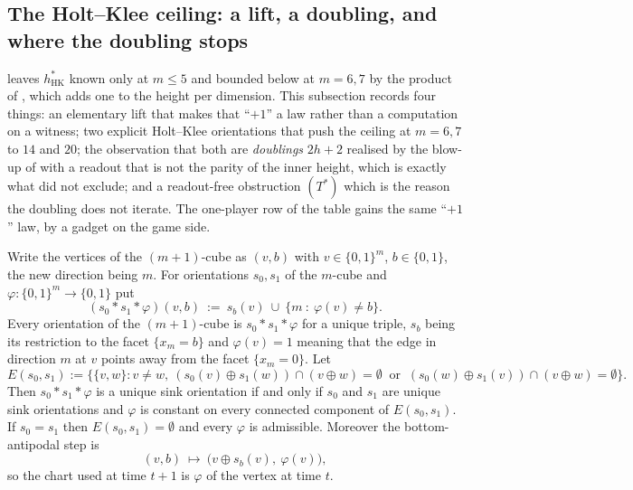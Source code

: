 \subsection{The Holt--Klee ceiling: a lift, a doubling, and where the doubling stops}\label{hkd:sec}

 leaves $h^{\ast}_{\mathrm{HK}}$ known only at
$m\le5$ and bounded below at $m=6,7$ by the product of
, which adds one to the height per dimension. This
subsection records four things: an elementary lift that makes that
``$+1$'' a law rather than a computation on a witness; two explicit
Holt--Klee orientations that push the ceiling at $m=6,7$ to $14$ and
$20$; the observation that both are \emph{doublings}
$2h+2$ realised by the blow-up of  with a readout that is
not the parity of the inner height, which is exactly what
 did not exclude; and a readout-free obstruction
$(T^{\ast})$ which is the reason the doubling does not iterate. The one-player row of the
table gains the same ``$+1$'' law, by a gadget on the game side.

\begin{lemma}\label{hkd:facet}
Write the vertices of the $(m+1)$-cube as $(v,b)$ with $v\in\{0,1\}^{m}$,
$b\in\{0,1\}$, the new direction being $m$. For orientations $s_0,s_1$ of
the $m$-cube and $\varphi:\{0,1\}^{m}\to\{0,1\}$ put
\[
  (s_0\!*\!s_1\!*\!\varphi)(v,b)\ :=\ s_b(v)\ \cup\ \{m\ :\ \varphi(v)\ne b\}.
\]
Every orientation of the $(m+1)$-cube is $s_0\!*\!s_1\!*\!\varphi$ for a
unique triple, $s_b$ being its restriction to the facet $\{x_m=b\}$ and
$\varphi(v)=1$ meaning that the edge in direction $m$ at $v$ points away
from the facet $\{x_m=0\}$. Let
\[
 E(s_0,s_1):=\bigl\{\{v,w\}: v\ne w,\ (s_0(v)\oplus s_1(w))\cap(v\oplus w)=\emptyset
   \ \text{ or }\ (s_0(w)\oplus s_1(v))\cap(v\oplus w)=\emptyset\bigr\}.
\]
Then $s_0\!*\!s_1\!*\!\varphi$ is a unique sink orientation if and only if
$s_0$ and $s_1$ are unique sink orientations and $\varphi$ is constant on
every connected component of $E(s_0,s_1)$. If $s_0=s_1$ then
$E(s_0,s_1)=\emptyset$ and every $\varphi$ is admissible. Moreover the
bottom-antipodal step is
\[
  (v,b)\ \longmapsto\ \bigl(v\oplus s_b(v),\ \varphi(v)\bigr),
\]
so the chart used at time $t+1$ is $\varphi$ of the vertex at time $t$.
\end{lemma}

